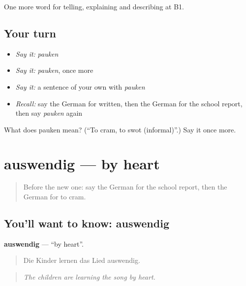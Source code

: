 \begin{grammarlens}[title={What you've built}]
One more word for telling, explaining and describing at B1.
\end{grammarlens}

\subsection*{Your turn}
\begin{itemize}
\raggedright
  \item \emph{Say it:} \emph{pauken}
  \item \emph{Say it:} \emph{pauken}, once more
  \item \emph{Say it:} a sentence of your own with \emph{pauken}
  \item \emph{Recall:} say the German for written, then the German for the school report, then say \emph{pauken} again
\end{itemize}

\begin{tcolorbox}[breakable,colback=teal!4,colframe=teal!35!black,title={Before you move on}]
What does pauken mean? (\textquotedblleft{}To cram, to swot (informal)\textquotedblright{}.) Say it once more.
\end{tcolorbox}
\section[auswendig]{auswendig — by heart}

\label{lesson:GE-C376-auswendig}



\begin{quote}
Before the new one: say the German for the school report, then the German for to cram.
\end{quote}

\subsection*{You'll want to know: auswendig}
\textbf{auswendig} — \textquotedblleft{}by heart\textquotedblright{}.

\begin{quote}
Die Kinder lernen das Lied auswendig.
\end{quote}

\begin{quote}
\emph{The children are learning the song by heart.}
\end{quote}

